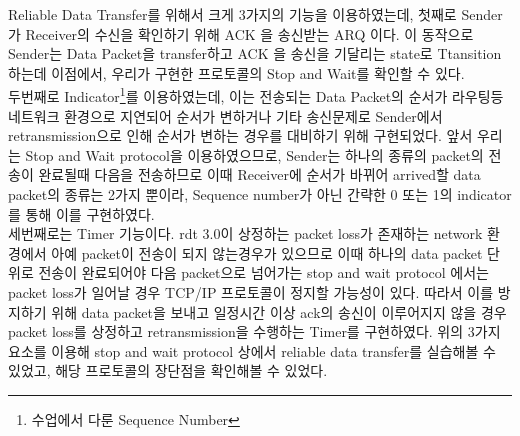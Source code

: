    Reliable Data Transfer를 위해서 크게 3가지의 기능을 이용하였는데, 첫째로 Sender가 Receiver의 수신을 확인하기 위해 ACK 을 송신받는 ARQ 이다. 이 동작으로 Sender는 Data Packet을 transfer하고 ACK 을 송신을 기달리는 state로 Ttansition 하는데 이점에서, 우리가 구현한 프로토콜의 Stop and Wait를 확인할 수 있다.\\
    두번째로 Indicator\footnote{수업에서 다룬 Sequence Number}를 이용하였는데, 이는 전송되는 Data Packet의 순서가 라우팅등 네트워크 환경으로 지연되어 순서가 변하거나 기타 송신문제로 Sender에서 retransmission으로 인해 순서가 변하는 경우를 대비하기 위해 구현되었다. 앞서 우리는 Stop and Wait
    protocol을 이용하였으므로, Sender는 하나의 종류의 packet의 전송이 완료될때 다음을 전송하므로 이때 Receiver에 순서가 바뀌어 arrived할 data packet의 종류는 2가지 뿐이라, Sequence number가 아닌 간략한 
    0 또는 1의 indicator를 통해 이를 구현하였다.\\
    세번째로는 Timer 기능이다. rdt 3.0이 상정하는 packet loss가 존재하는 network 환경에서 아예 packet이 
    전송이 되지 않는경우가 있으므로 이때 하나의 data packet 단위로 전송이 완료되어야 다음 packet으로 
    넘어가는 stop and wait protocol 에서는 packet loss가 일어날 경우 TCP/IP 프로토콜이 정지할 가능성이 있다. 따라서 이를 방지하기 위해 data packet을 보내고 일정시간 이상 ack의 송신이 이루어지지 않을 경우 
    packet loss를 상정하고 retransmission을 수행하는 Timer를 구현하였다. 
    위의 3가지 요소를 이용해 stop and wait protocol 상에서 reliable data transfer를 실습해볼 수 있었고, 
    해당 프로토콜의 장단점을 확인해볼 수 있었다.
